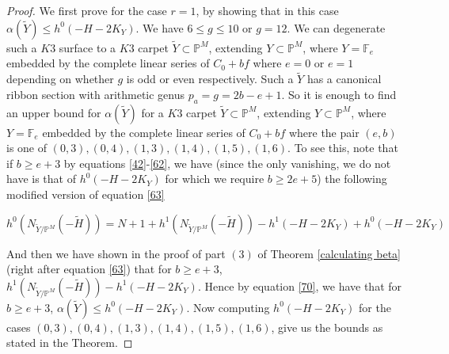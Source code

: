 \documentclass[11pt,twoside]{amsart}
\theoremstyle{plain}
\numberwithin{equation}{section}
\theoremstyle{definition}
\begin{document}
\begin{proof}
  We first prove for the case $r = 1$, by showing that in this case $\alpha({\widetilde{Y}}) \leq h^0(-H-2K_Y)$. We have $6 \leq g \leq 10$ or $g = 12$. We can degenerate such a $K3$ surface to a $K3$ carpet $\widetilde{Y} \subset \mathbb{P}^M$, extending $Y \subset \mathbb{P}^M$, where $Y = \mathbb{F}_e$ embedded by the complete linear series of $C_0+bf$ where $e = 0$ or $e = 1$ depending on whether $g$ is odd or even respectively. Such a $\widetilde{Y}$ has a canonical ribbon section with arithmetic genus $p_a = g = 2b-e+1$. So it is enough to find an upper bound for $\alpha(\widetilde{Y})$ for a $K3$ carpet $\widetilde{Y} \subset \mathbb{P}^M$, extending $Y \subset \mathbb{P}^M$, where $Y = \mathbb{F}_e$ embedded by the complete linear series of $C_0+bf$ where the pair $(e,b)$ is one of $(0,3), (0,4), (1,3), (1,4), (1,5), (1,6)$. To see this, note that if $b \geq e+3$ by equations \ref{42}-\ref{62}, we have (since the only vanishing, we do not have is that of $h^0(-H-2K_Y)$ for which we require $b \geq 2e+5$)  the following modified version of equation \ref{63}   
  
\begin{equation}\label{70}
    h^0(N_{\widetilde{Y}/\mathbb{P}^M}(-\widetilde{H})) = N+1 + h^1(N_{\widetilde{Y}/\mathbb{P}^M}(-\widetilde{H}))-h^1(-H-2K_Y) + h^0(-H-2K_Y)
\end{equation}

And then we have shown in the proof of part $(3)$ of Theorem \ref{calculating beta} (right after equation \ref{63}) that for $b \geq e+3$, $h^1(N_{\widetilde{Y}/\mathbb{P}^M}(-\widetilde{H}))-h^1(-H-2K_Y)$. Hence by equation \ref{70}, we have that for $b \geq e+3$, $\alpha({\widetilde{Y}}) \leq h^0(-H-2K_Y)$. Now computing $h^0(-H-2K_Y)$ for the cases $(0,3), (0,4), (1,3), (1,4), (1,5), (1,6)$, give us the bounds as stated in the Theorem.  \par


\end{proof}
\end{document}
